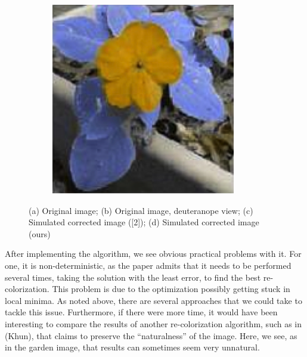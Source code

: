 \documentclass[10pt,twocolumn,letterpaper]{article}
\begin{document}
\begin{figure}[h]
\begin{subfigure}{0.23\textwidth}
    \caption{}
  \end{subfigure}
  \begin{subfigure}{0.23\textwidth}
    \includegraphics[width=\textwidth]{flower4.png}
    \caption{}
  \end{subfigure}
  \caption{(a) Original image; (b) Original image, deuteranope view; (c) Simulated corrected image ([2]); (d) Simulated corrected image (ours)}
  \label{fig:flower}
\end{figure}

	After implementing the algorithm, we see obvious practical problems with it. For one, it is non-deterministic, as the paper admits that it needs to be performed several times, taking the solution with the least error, to find the best re-colorization. This problem is due to the optimization possibly getting stuck in local minima. As noted above, there are several approaches that we could take to tackle this issue. Furthermore, if there were more time, it would have been interesting to compare the results of another re-colorization algorithm, such as in (Khun), that claims to preserve the “naturalness” of the image. Here, we see, as in the garden image, that results can sometimes seem very unnatural. 
\end{document}
